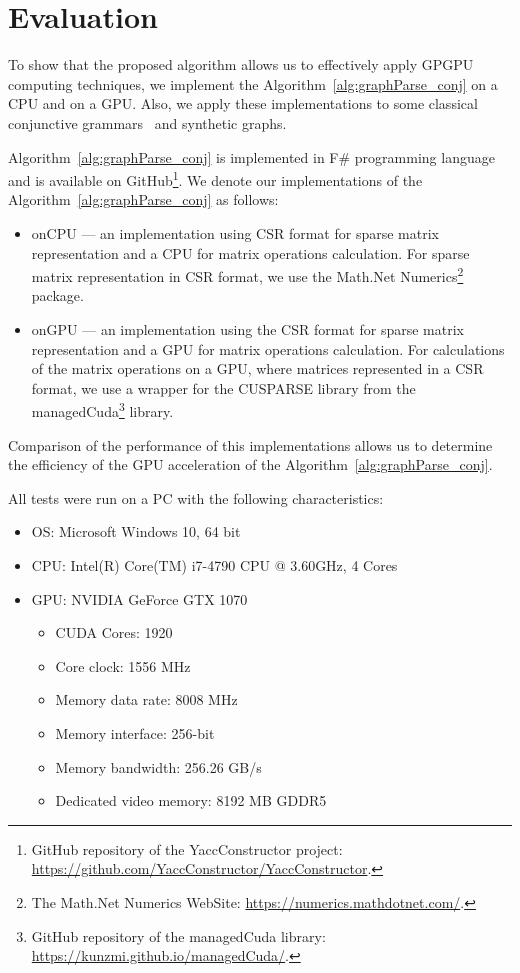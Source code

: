 \section{Evaluation} \label{section_evaluation}
To show that the proposed algorithm allows us to effectively apply GPGPU computing techniques, we implement the Algorithm~\ref{alg:graphParse_conj} on a CPU and on a GPU. Also, we apply these implementations to some classical conjunctive grammars~\cite{okhotin2001conjunctive} and synthetic graphs.

Algorithm~\ref{alg:graphParse_conj} is implemented in F\# programming language~\cite{fsharp} and is available on GitHub\footnote{GitHub repository of the YaccConstructor project: \url{https://github.com/YaccConstructor/YaccConstructor}.}. We denote our implementations of the Algorithm~\ref{alg:graphParse_conj} as follows:
\begin{itemize}
    \item onCPU --- an implementation using CSR format for sparse matrix representation and a CPU for matrix operations calculation. For sparse matrix representation in CSR format, we use the Math.Net Numerics\footnote{The Math.Net Numerics WebSite: \url{https://numerics.mathdotnet.com/}.} package.
    \item onGPU --- an implementation using the CSR format for sparse matrix representation and a GPU for matrix operations calculation. For calculations of the matrix operations on a GPU, where matrices represented in a CSR format, we use a wrapper for the CUSPARSE library from the managedCuda\footnote{GitHub repository of the managedCuda library: \url{https://kunzmi.github.io/managedCuda/}.} library.
\end{itemize}

Comparison of the performance of this implementations allows us to determine the efficiency of the GPU acceleration of the Algorithm~\ref{alg:graphParse_conj}.

All tests were run on a PC with the following characteristics:
\begin{itemize}
    \item OS: Microsoft Windows 10, 64 bit
    \item CPU: Intel(R) Core(TM) i7-4790 CPU @ 3.60GHz, 4 Cores
    \item GPU: NVIDIA GeForce GTX 1070
    \begin{itemize}
        \item CUDA Cores:       1920 
        \item Core clock:       1556 MHz 
        \item Memory data rate: 8008 MHz
        \item Memory interface: 256-bit 
        \item Memory bandwidth: 256.26 GB/s
        \item Dedicated video memory:   8192 MB GDDR5
    \end{itemize}
\end{itemize}

